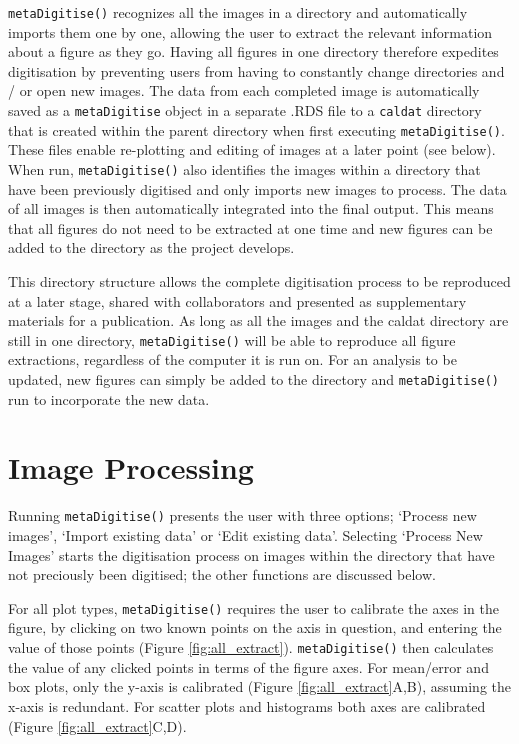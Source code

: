 \documentclass[12pt]{article}
\newcommand{\code}[1]{\texttt{#1}}
\newcommand{\fct}[1]{\texttt{#1()}}
\begin{document}
\fct{metaDigitise} recognizes all the images in a directory and automatically imports them one by one, allowing the user to extract the relevant information about a figure as they go. Having all figures in one directory therefore expedites digitisation by preventing users from having to constantly change directories and / or open new images. The data from each completed image is automatically saved as a \code{metaDigitise} object in a separate .RDS file to a \code{caldat} directory that is created within the parent directory when first executing \fct{metaDigitise}. These files enable re-plotting and editing of images at a later point (see below). When run, \fct{metaDigitise} also identifies the images within a directory that have been previously digitised and only imports new images to process. The data of all images is then automatically integrated into the final output. This means that all figures do not need to be extracted at one time and new figures can be added to the directory as the project develops.

This directory structure allows the complete digitisation process to be reproduced at a later stage, shared with collaborators and presented as supplementary materials for a publication. As long as all the images and the caldat directory are still in one directory, \fct{metaDigitise} will be able to reproduce all figure extractions, regardless of the computer it is run on. For an analysis to be updated, new figures can simply be added to the directory and \fct{metaDigitise} run to incorporate the new data. 



\section{Image Processing}
Running \fct{metaDigitise} presents the user with three options; `Process new images', `Import existing data' or `Edit existing data'. Selecting `Process New Images' starts the digitisation process on images within the directory that have not preciously been digitised; the other functions are discussed below.

For all plot types, \fct{metaDigitise} requires the user to calibrate the axes in the figure, by clicking on two known points on the axis in question, and entering the value of those points (Figure \ref{fig:all_extract}). \fct{metaDigitise} then calculates the value of any clicked points in terms of the figure axes. For mean/error and box plots, only the y-axis is calibrated (Figure \ref{fig:all_extract}A,B), assuming the x-axis is redundant. For scatter plots and histograms both axes are calibrated (Figure \ref{fig:all_extract}C,D).
\end{document}
